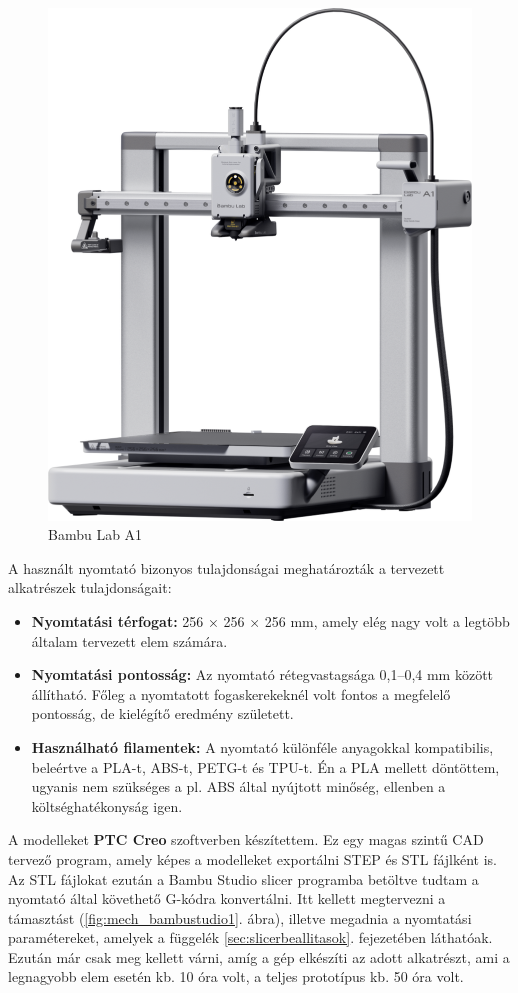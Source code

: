 \documentclass[12pt,a4paper]{article}
\begin{document}
\begin{figure}[h!]
	\centering
	\includegraphics[width=.7\linewidth]{mech_bambu} 
	\caption{Bambu Lab A1 \cite{bambu}}
	\label{fig:mech_bambu}
\end{figure}
\pagebreak

A használt nyomtató bizonyos tulajdonságai meghatározták a tervezett alkatrészek tulajdonságait:

\begin{itemize}
	\item \textbf{Nyomtatási térfogat:} 256 × 256 × 256 mm, amely elég nagy volt a legtöbb általam tervezett elem számára.
	\item \textbf{Nyomtatási pontosság:} Az nyomtató rétegvastagsága 0,1–0,4 mm között állítható. Főleg a nyomtatott fogaskerekeknél volt fontos a megfelelő pontosság, de kielégítő eredmény született.
	\item \textbf{Használható filamentek:} A nyomtató különféle anyagokkal kompatibilis, beleértve a PLA-t, ABS-t, PETG-t és TPU-t. Én a PLA mellett döntöttem, ugyanis nem szükséges a pl. ABS által nyújtott minőség, ellenben a költséghatékonyság igen.
\end{itemize}

A modelleket \textbf{PTC Creo} szoftverben készítettem. Ez egy magas szintű CAD tervező program, amely képes a modelleket exportálni STEP és STL fájlként is. Az STL fájlokat ezután a Bambu Studio slicer programba betöltve tudtam a nyomtató által követhető G-kódra konvertálni. Itt kellett megtervezni a támasztást (\ref{fig:mech_bambustudio1}. ábra), illetve megadnia a nyomtatási paramétereket, amelyek a függelék \ref{sec:slicerbeallitasok}. fejezetében láthatóak. Ezután már csak meg kellett várni, amíg a gép elkészíti az adott alkatrészt, ami a legnagyobb elem esetén kb. 10 óra volt, a teljes prototípus kb. 50 óra volt.
\end{document}

